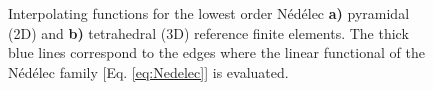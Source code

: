 \begin{figure}[t!]
    \hspace*{-.7\textwidth}
    \vspace*{7.5em}%
     \begin{subfigure}{\textwidth}\caption{ }\label{fig:Nedelec:a}\end{subfigure}\\
    \hspace*{-.7\textwidth}
     \begin{subfigure}{\textwidth}\caption{ }\label{fig:Nedelec:b}\end{subfigure}
     \vspace*{-11.5em}\\
    \centering
    \scriptsize
    \def\svgwidth{.875\textwidth}
\caption[Pyramidal and Tetrahedral Nédélec Finite Element Family of lowest Order]{Interpolating functions for the lowest order Nédélec \textbf{a)} pyramidal (2D) and \textbf{b)} tetrahedral (3D) reference finite elements. The thick blue lines correspond to the edges where the linear functional of the Nédélec family [Eq. \eqref{eq:Nedelec}] is evaluated.}
\label{fig:Nedelec}
\end{figure}
